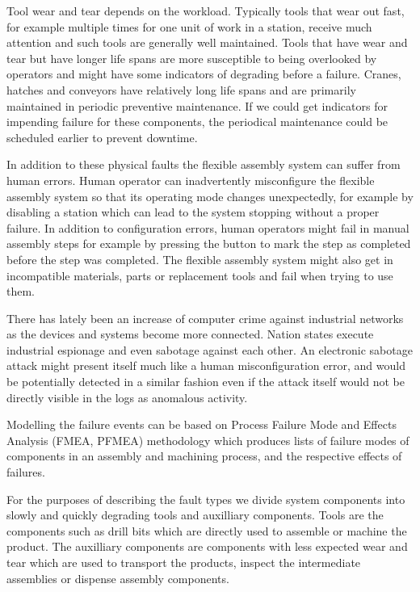 \documentclass[procedia]{easychair}
\begin{document}
Tool wear and tear depends on the workload. Typically tools that wear out fast, for example multiple times for one unit of work in a station, receive much attention and such tools are generally
well maintained. Tools that have wear and tear but have longer life spans are more susceptible to being overlooked by operators and might have some indicators of degrading
before a failure. Cranes, hatches and conveyors have relatively long life spans and are primarily maintained in periodic preventive maintenance. If we could get indicators
for impending failure for these components, the periodical maintenance could be scheduled earlier to prevent downtime.

In addition to these physical faults the flexible
assembly system can suffer from human errors. Human operator can inadvertently misconfigure the flexible assembly system so that its operating mode changes unexpectedly,
for example by disabling a station which can lead to the system stopping without a proper failure. In addition to configuration
errors, human operators might fail in manual assembly steps for example by pressing the button to mark the step
as completed before the step was completed.
The flexible assembly system might also get in incompatible materials, parts or replacement tools and fail when trying to use them.

There has lately been an increase of computer crime against industrial networks as the devices and systems become more connected.
Nation states execute industrial espionage and even sabotage against each other\cite{stuxnet}. An electronic sabotage attack might present itself
much like a human misconfiguration error, and would be potentially detected in a similar fashion even if the attack itself would not be
directly visible in the logs as anomalous activity.

Modelling the failure events can be based on Process Failure Mode and Effects Analysis (FMEA, PFMEA) \cite{teng1996failure} methodology which produces lists of
failure modes of components
in an assembly and machining process, and the respective effects of failures.

For the purposes of describing the fault types we divide system components into slowly and
quickly degrading tools and auxilliary components. Tools are the components such as drill bits which are directly used to assemble or
machine the product. The auxilliary components are components with less expected wear and tear which are used to transport the products,
inspect the intermediate assemblies or dispense assembly components.
\end{document}
